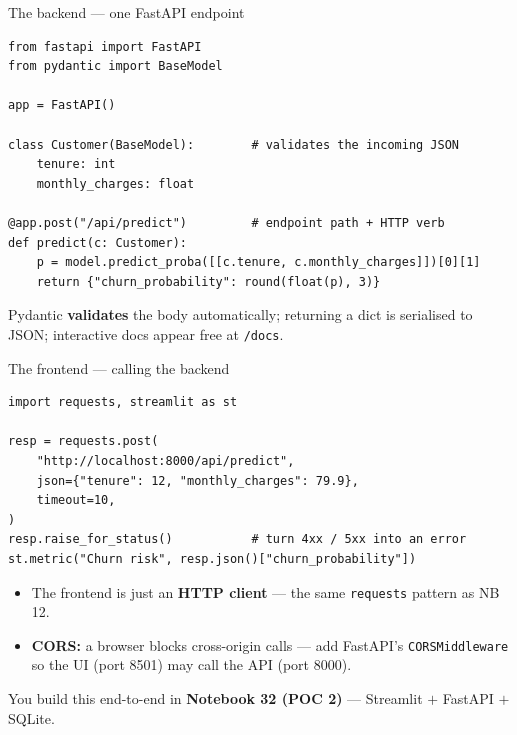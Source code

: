 \documentclass[aspectratio=169,11pt]{beamer}
\begin{document}
\begin{frame}[fragile]{The backend --- one FastAPI endpoint}
\begin{lstlisting}[style=py]
from fastapi import FastAPI
from pydantic import BaseModel

app = FastAPI()

class Customer(BaseModel):        # validates the incoming JSON
    tenure: int
    monthly_charges: float

@app.post("/api/predict")         # endpoint path + HTTP verb
def predict(c: Customer):
    p = model.predict_proba([[c.tenure, c.monthly_charges]])[0][1]
    return {"churn_probability": round(float(p), 3)}
\end{lstlisting}
  \vspace{-2pt}
  {\footnotesize Pydantic \textbf{validates} the body automatically; returning a dict is serialised to JSON; interactive docs appear free at \texttt{/docs}.}
\end{frame}

\begin{frame}[fragile]{The frontend --- calling the backend}
\begin{lstlisting}[style=py]
import requests, streamlit as st

resp = requests.post(
    "http://localhost:8000/api/predict",
    json={"tenure": 12, "monthly_charges": 79.9},
    timeout=10,
)
resp.raise_for_status()           # turn 4xx / 5xx into an error
st.metric("Churn risk", resp.json()["churn_probability"])
\end{lstlisting}
  \begin{itemize}
    \item The frontend is just an \textbf{HTTP client} --- the same \texttt{requests} pattern as NB 12.
    \item \textbf{CORS:} a browser blocks cross-origin calls --- add FastAPI's \texttt{CORSMiddleware} so the UI (port 8501) may call the API (port 8000).
  \end{itemize}
  {\footnotesize You build this end-to-end in \textbf{Notebook 32 (POC 2)} --- Streamlit $+$ FastAPI $+$ SQLite.}
\end{frame}

\end{document}
